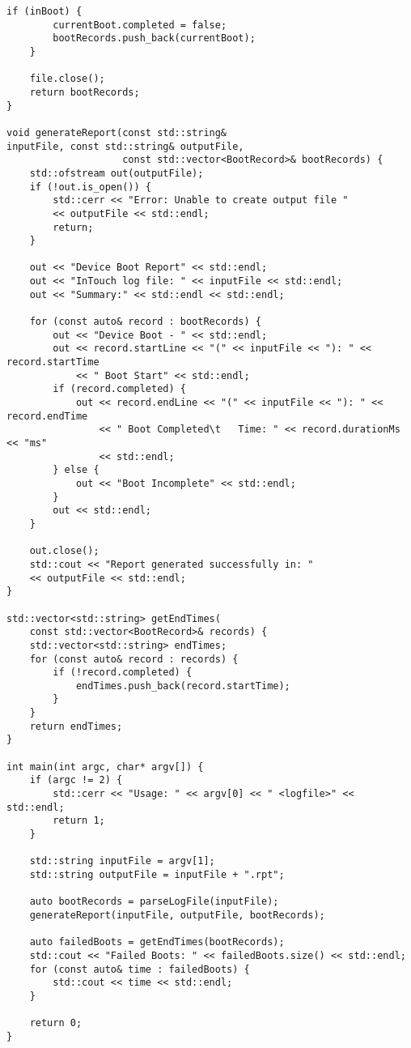\documentclass[12pt]{article}
\begin{document}
\begin{lstlisting}[style=cppcode]
    if (inBoot) {
        currentBoot.completed = false;
        bootRecords.push_back(currentBoot);
    }

    file.close();
    return bootRecords;
}

void generateReport(const std::string&
inputFile, const std::string& outputFile,
                    const std::vector<BootRecord>& bootRecords) {
    std::ofstream out(outputFile);
    if (!out.is_open()) {
        std::cerr << "Error: Unable to create output file "
        << outputFile << std::endl;
        return;
    }

    out << "Device Boot Report" << std::endl;
    out << "InTouch log file: " << inputFile << std::endl;
    out << "Summary:" << std::endl << std::endl;

    for (const auto& record : bootRecords) {
        out << "Device Boot - " << std::endl;
        out << record.startLine << "(" << inputFile << "): " << record.startTime
            << " Boot Start" << std::endl;
        if (record.completed) {
            out << record.endLine << "(" << inputFile << "): " << record.endTime
                << " Boot Completed\t   Time: " << record.durationMs << "ms"
                << std::endl;
        } else {
            out << "Boot Incomplete" << std::endl;
        }
        out << std::endl;
    }

    out.close();
    std::cout << "Report generated successfully in: "
    << outputFile << std::endl;
}

std::vector<std::string> getEndTimes(
    const std::vector<BootRecord>& records) {
    std::vector<std::string> endTimes;
    for (const auto& record : records) {
        if (!record.completed) {
            endTimes.push_back(record.startTime);
        }
    }
    return endTimes;
}

int main(int argc, char* argv[]) {
    if (argc != 2) {
        std::cerr << "Usage: " << argv[0] << " <logfile>" << std::endl;
        return 1;
    }

    std::string inputFile = argv[1];
    std::string outputFile = inputFile + ".rpt";

    auto bootRecords = parseLogFile(inputFile);
    generateReport(inputFile, outputFile, bootRecords);

    auto failedBoots = getEndTimes(bootRecords);
    std::cout << "Failed Boots: " << failedBoots.size() << std::endl;
    for (const auto& time : failedBoots) {
        std::cout << time << std::endl;
    }

    return 0;
}

\end{lstlisting}
\end{document}
